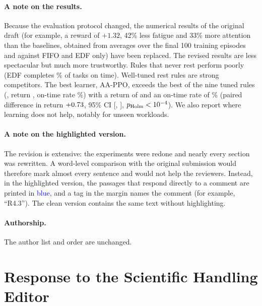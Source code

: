 \documentclass[11pt]{article}
\begin{document}
\paragraph{A note on the results.} Because the evaluation protocol changed, the numerical results of the original draft (for example, a reward of $+1.32$, 42\% less fatigue and 33\% more attention than the baselines, obtained from averages over the final 100 training episodes and against FIFO and EDF only) have been replaced. The revised results are less spectacular but much more trustworthy. Rules that never rest perform poorly (EDF completes \EDFOnTimePct\% of tasks on time). Well-tuned rest rules are strong competitors. The best learner, AA-PPO, exceeds the best of the nine tuned rules (\bestHeur, return \bestHeurReturn, on-time rate \bestHeurOnTimePct\%) with a return of \PPOReturn{} and an on-time rate of \PPOOnTimePct\% (paired difference in return $+0.73$, 95\% CI [\PpoRetSPTThresholdLo, \PpoRetSPTThresholdHi], $p_{\mathrm{Holm}}<10^{-4}$). We also report where learning does not help, notably for unseen workloads.

\paragraph{A note on the highlighted version.} The revision is extensive: the experiments were redone and nearly every section was rewritten. A word-level comparison with the original submission would therefore mark almost every sentence and would not help the reviewers. Instead, in the highlighted version, the passages that respond directly to a comment are printed in \textcolor{blue}{blue}, and a tag in the margin names the comment (for example, ``R4.3''). The clean version contains the same text without highlighting.

\paragraph{Authorship.} The author list and order are unchanged.

\section*{Response to the Scientific Handling Editor}
\end{document}
